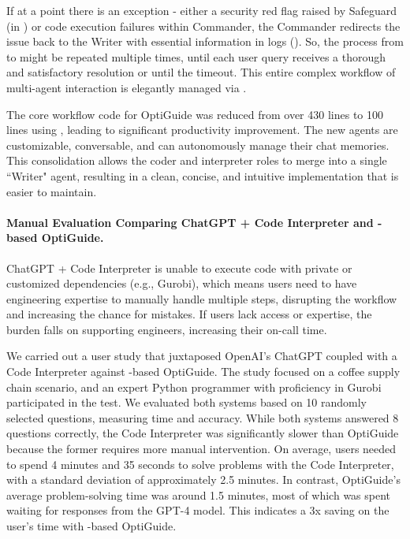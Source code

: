 If at a point there is an exception - either a security red flag raised by Safeguard (in ) or code execution failures within Commander, the Commander redirects the issue back to the Writer with essential information in logs ().
So, the process from  to  might be repeated multiple times, until each user query receives a thorough and satisfactory resolution or until the timeout. This entire complex workflow of multi-agent interaction is elegantly managed via \libName.


The core workflow code for OptiGuide was reduced from over 430 lines to 100 lines using \libName, leading to significant productivity improvement. The new agents are customizable, conversable, and can autonomously manage their chat memories. This consolidation allows the coder and interpreter roles to merge into a single ``Writer" agent, resulting in a clean, concise, and intuitive implementation that is easier to maintain.

\paragraph{Manual Evaluation Comparing ChatGPT + Code Interpreter and \libName-based OptiGuide.}
ChatGPT + Code Interpreter is unable to execute code with private or customized dependencies (e.g., Gurobi), which means users need to have engineering expertise to manually handle multiple steps, disrupting the workflow and increasing the chance for mistakes. If users lack access or expertise, the burden falls on supporting engineers, increasing their on-call time.

We carried out a user study that juxtaposed OpenAI's ChatGPT coupled with a Code Interpreter against \libName-based OptiGuide. The study focused on a coffee supply chain scenario, and an expert Python programmer with proficiency in Gurobi participated in the test. We evaluated both systems based on 10 randomly selected questions, measuring time and accuracy. While both systems answered 8 questions correctly, the Code Interpreter was significantly slower than OptiGuide because the former requires more manual intervention. On average, users needed to spend 4 minutes and 35 seconds to solve problems with the Code Interpreter, with a standard deviation of approximately 2.5 minutes. In contrast, OptiGuide's average problem-solving time was around 1.5 minutes, most of which was spent waiting for responses from the GPT-4 model. This indicates a 3x saving on the user's time with \libName-based OptiGuide.

